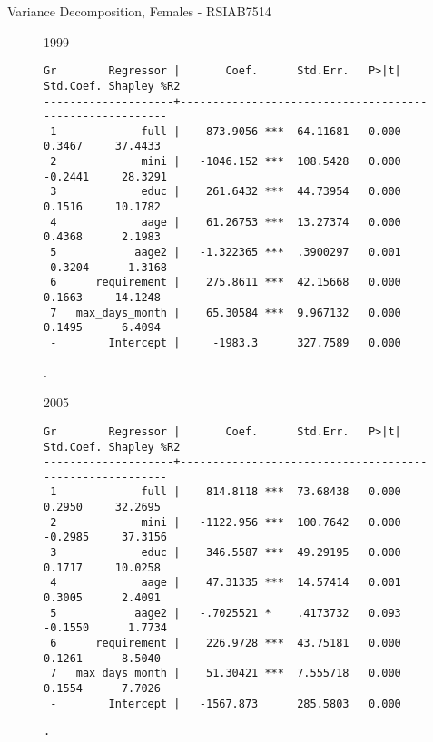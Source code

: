 \documentclass{beamer}
\begin{document}
\begin{frame}[fragile]{Variance Decomposition, Females - RSIAB7514}
\begin{figure}
\centering
\begin{minipage}[b]{0.4\textwidth}{1999}
\begin{Verbatim}[fontsize=\tiny]
Gr        Regressor |       Coef.      Std.Err.   P>|t|  Std.Coef. Shapley %R2
--------------------+---------------------------------------------------------
 1             full |    873.9056 ***  64.11681   0.000     0.3467     37.4433
 2             mini |   -1046.152 ***  108.5428   0.000    -0.2441     28.3291
 3             educ |    261.6432 ***  44.73954   0.000     0.1516     10.1782
 4             aage |    61.26753 ***  13.27374   0.000     0.4368      2.1983
 5            aage2 |   -1.322365 ***  .3900297   0.001    -0.3204      1.3168
 6      requirement |    275.8611 ***  42.15668   0.000     0.1663     14.1248
 7   max_days_month |    65.30584 ***  9.967132   0.000     0.1495      6.4094
 -        Intercept |     -1983.3      327.7589   0.000  
\end{Verbatim}
\end{minipage}
\begin{minipage}{0.4\textwidth}
.
\end{minipage}
\end{figure}
\begin{figure}
\centering
\begin{minipage}[b]{0.4\textwidth}{2005}
\begin{Verbatim}[fontsize=\tiny]
Gr        Regressor |       Coef.      Std.Err.   P>|t|  Std.Coef. Shapley %R2
--------------------+---------------------------------------------------------
 1             full |    814.8118 ***  73.68438   0.000     0.2950     32.2695
 2             mini |   -1122.956 ***  100.7642   0.000    -0.2985     37.3156
 3             educ |    346.5587 ***  49.29195   0.000     0.1717     10.0258
 4             aage |    47.31335 ***  14.57414   0.001     0.3005      2.4091
 5            aage2 |   -.7025521 *    .4173732   0.093    -0.1550      1.7734
 6      requirement |    226.9728 ***  43.75181   0.000     0.1261      8.5040
 7   max_days_month |    51.30421 ***  7.555718   0.000     0.1554      7.7026
 -        Intercept |   -1567.873      285.5803   0.000  
\end{Verbatim}
\end{minipage}
\begin{minipage}[b]{0.4\textwidth}
\begin{Verbatim}[fontsize=\tiny]
.
\end{Verbatim}
\end{minipage}
\end{figure}
\end{frame}
\end{document}
